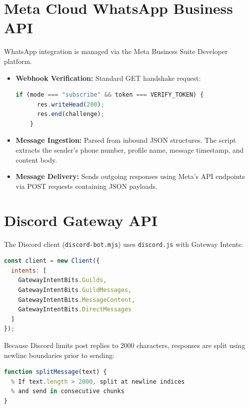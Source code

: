 \documentclass[12pt,a4paper]{report}
\begin{document}
\section{Meta Cloud WhatsApp Business API}
WhatsApp integration is managed via the Meta Business Suite Developer platform.
\begin{itemize}
    \item \textbf{Webhook Verification:} Standard GET handshake request:
    \begin{lstlisting}[language=JavaScript]
    if (mode === "subscribe" && token === VERIFY_TOKEN) {
      res.writeHead(200);
      res.end(challenge);
    }
    \end{lstlisting}
    \item \textbf{Message Ingestion:} Parsed from inbound JSON structures. The script extracts the sender's phone number, profile name, message timestamp, and content body.
    \item \textbf{Message Delivery:} Sends outgoing responses using Meta's API endpoints via POST requests containing JSON payloads.
\end{itemize}

\section{Discord Gateway API}
The Discord client (\texttt{discord-bot.mjs}) uses \texttt{discord.js} with Gateway Intents:
\begin{lstlisting}[language=JavaScript]
const client = new Client({
  intents: [
    GatewayIntentBits.Guilds,
    GatewayIntentBits.GuildMessages,
    GatewayIntentBits.MessageContent,
    GatewayIntentBits.DirectMessages
  ]
});
\end{lstlisting}
Because Discord limits post replies to 2000 characters, responses are split using newline boundaries prior to sending:
\begin{lstlisting}[language=JavaScript]
function splitMessage(text) {
  % If text.length > 2000, split at newline indices
  % and send in consecutive chunks
}
\end{lstlisting}
\end{document}
